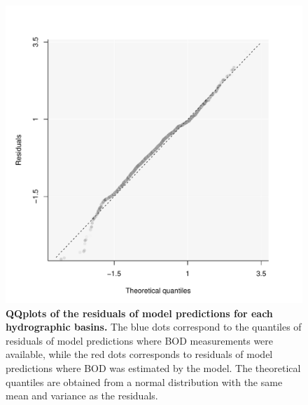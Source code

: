 \documentclass[11pt, oneside]{article}
\begin{document}
\begin{figure}[H]
\begin{center}
\includegraphics[page=1, width=1\linewidth]{scripts/b0_6_3/out_con/fig_qqplot_residuals.pdf}
\caption{
    \textbf{QQplots of the residuals of model predictions for each hydrographic basins.}
    The blue dots correspond to the quantiles of residuals of model predictions where BOD measurements were available, while the red dots corresponds to residuals of model predictions where BOD was estimated by the model.
    The theoretical quantiles are obtained from a normal distribution with the same mean and variance as the residuals.
} 
\end{center}
\end{figure}
\end{document}
